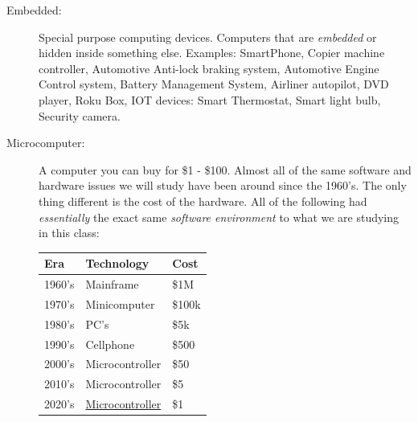 \begin{description}

\item [Embedded:] Special purpose computing devices.
Computers that are {\it embedded} or hidden inside something
else.  Examples:  SmartPhone, Copier machine controller, Automotive Anti-lock
braking system, Automotive Engine Control system, Battery Management System, 
Airliner autopilot,  DVD player, Roku Box, IOT devices: Smart
Thermostat, Smart light bulb, Security camera.

\item [Microcomputer:] A computer you can buy for \$1 - \$100.
Almost all of the same software and hardware issues we will study
have been around since the 1960's.  The only thing different is
the cost of the hardware.  All of the following had {\it  essentially}
the exact same {\it software environment} to what we are studying in this class:


\begin{center}
\begin{tabular}{|l|l|l|}
\hline
Era             &       Technology        & Cost \\ \hline
1960's          &       Mainframe         & \$1M \\ \hline
1970's          &       Minicomputer      & \$100k \\ \hline
1980's          &       PC's              & \$5k   \\ \hline
1990's          &       Cellphone         & \$500  \\ \hline
2000's          &       Microcontroller   & \$50  \\ \hline
2010's          &       Microcontroller   & \$5   \\ \hline
2020's          &       \href{https://jaycarlson.net/microcontrollers/}{Microcontroller}   & \$1   \\ \hline
\end{tabular}
\end{center}




\end{description}
